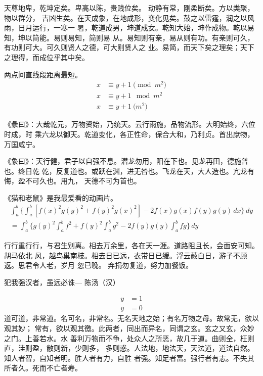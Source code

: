 天尊地卑，乾坤定矣。卑高以陈，贵贱位矣。 动静有常，刚柔断矣。方以类聚，物以群分，
吉凶生矣。在天成象，在地成形，变化见矣。鼓之以雷霆，润之以风雨，日月运行，一寒一
暑，乾道成男，坤道成女。乾知大始，坤作成物。乾以易知，坤以简能。易则易知，简则易
从。易知则有亲，易从则有功。有亲则可久，有功则可大。可久则贤人之德，可大则贤人之
业。易简，而天下矣之理矣；天下之理得，而成位乎其中矣。

\begin{axiom}
两点间直线段距离最短。  
\begin{align}
x&\equiv y+1\pmod{m^2}\\
x&\equiv y+1\mod{m^2}\\
x&\equiv y+1\pod{m^2}
\end{align}
\end{axiom}

《彖曰》：大哉乾元，万物资始，乃统天。云行雨施，品物流形。大明始终，六位时成，时
乘六龙以御天。乾道变化，各正性命，保合大和，乃利贞。首出庶物，万国咸宁。

《象曰》：天行健，君子以自强不息。潜龙勿用，阳在下也。见龙再田，德施普也。终日乾
乾，反复道也。或跃在渊，进无咎也。飞龙在天，大人造也。亢龙有悔，盈不可久也。用九，
天德不可为首也。 　　

\begin{lemma}
《猫和老鼠》是我最爱看的动画片。
\begin{multline*}%
\int_a^b\biggl\{\int_a^b[f(x)^2g(y)^2+f(y)^2g(x)^2]
 -2f(x)g(x)f(y)g(y)\,dx\biggr\}\,dy \\
 =\int_a^b\biggl\{g(y)^2\int_a^bf^2+f(y)^2
  \int_a^b g^2-2f(y)g(y)\int_a^b fg\biggr\}\,dy
\end{multline*}
\end{lemma}

行行重行行，与君生别离。相去万余里，各在天一涯。道路阻且长，会面安可知。胡马依北
风，越鸟巢南枝。相去日已远，衣带日已缓。浮云蔽白日，游子不顾返。思君令人老，岁月
忽已晚。  弃捐勿复道，努力加餐饭。

\begin{theorem}\label{the:theorem1}
犯我强汉者，虽远必诛\hfill --- 陈汤（汉）
\end{theorem}
\begin{subequations}
\begin{align}
y & = 1 \\
y & = 0
\end{align}
\end{subequations}
道可道，非常道。名可名，非常名。无名天地之始；有名万物之母。故常无，欲以观其妙；
常有，欲以观其徼。此两者，同出而异名，同谓之玄。玄之又玄，众妙之门。上善若水。水
善利万物而不争，处众人之所恶，故几于道。曲则全，枉则直，洼则盈，敝则新，少则多，
多则惑。人法地，地法天，天法道，道法自然。知人者智，自知者明。胜人者有力，自胜
者强。知足者富。强行者有志。不失其所者久。死而不亡者寿。

